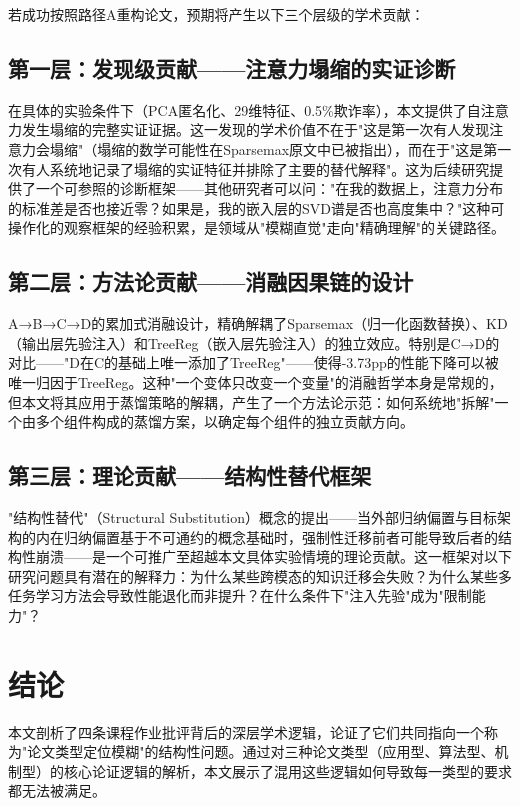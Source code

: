 \documentclass[UTF8,a4paper,12pt,fontset=fandol]{ctexart}
\begin{document}
若成功按照路径A重构论文，预期将产生以下三个层级的学术贡献：

\subsection{第一层：发现级贡献——注意力塌缩的实证诊断}

在具体的实验条件下（PCA匿名化、29维特征、0.5\%欺诈率），本文提供了自注意力发生塌缩的完整实证证据。这一发现的学术价值不在于"这是第一次有人发现注意力会塌缩"（塌缩的数学可能性在Sparsemax原文中已被指出），而在于"这是第一次有人系统地记录了塌缩的实证特征并排除了主要的替代解释"。这为后续研究提供了一个可参照的诊断框架——其他研究者可以问："在我的数据上，注意力分布的标准差是否也接近零？如果是，我的嵌入层的SVD谱是否也高度集中？"这种可操作化的观察框架的经验积累，是领域从"模糊直觉"走向"精确理解"的关键路径。

\subsection{第二层：方法论贡献——消融因果链的设计}

A→B→C→D的累加式消融设计，精确解耦了Sparsemax（归一化函数替换）、KD（输出层先验注入）和TreeReg（嵌入层先验注入）的独立效应。特别是C→D的对比——"D在C的基础上唯一添加了TreeReg"——使得-3.73pp的性能下降可以被唯一归因于TreeReg。这种"一个变体只改变一个变量"的消融哲学本身是常规的，但本文将其应用于蒸馏策略的解耦，产生了一个方法论示范：如何系统地"拆解"一个由多个组件构成的蒸馏方案，以确定每个组件的独立贡献方向。

\subsection{第三层：理论贡献——结构性替代框架}

"结构性替代"（Structural Substitution）概念的提出——当外部归纳偏置与目标架构的内在归纳偏置基于不可通约的概念基础时，强制性迁移前者可能导致后者的结构性崩溃——是一个可推广至超越本文具体实验情境的理论贡献。这一框架对以下研究问题具有潜在的解释力：为什么某些跨模态的知识迁移会失败？为什么某些多任务学习方法会导致性能退化而非提升？在什么条件下"注入先验"成为"限制能力"？

\section{结论}

本文剖析了四条课程作业批评背后的深层学术逻辑，论证了它们共同指向一个称为"论文类型定位模糊"的结构性问题。通过对三种论文类型（应用型、算法型、机制型）的核心论证逻辑的解析，本文展示了混用这些逻辑如何导致每一类型的要求都无法被满足。
\end{document}
